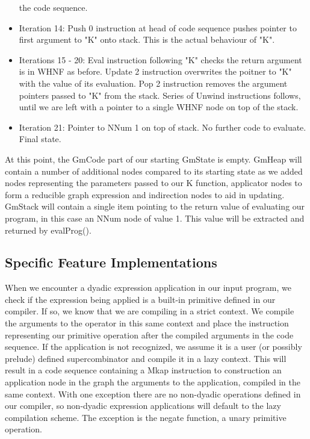 \begin{itemize}
          the code sequence.
    \item Iteration 14: Push 0 instruction at head of code sequence
          pushes pointer to first argument to "K" onto stack. This
          is the actual behaviour of "K".
    \item Iterations 15 - 20: Eval instruction following "K" checks
          the return argument is in WHNF as before. Update 2 instruction
          overwrites the poitner to "K" with the value of its evaluation.
          Pop 2 instruction removes the argument pointers passed to
          "K" from the stack. Series of Unwind instructions follows,
          until we are left with a pointer to a single WHNF node on
          top of the stack.
    \item Iteration 21: Pointer to NNum 1 on top of stack. No further
          code to evaluate. Final state.
\end{itemize}

At this point, the GmCode part of our starting GmState is empty.
GmHeap will contain a number of additional nodes compared to its
starting state as we added nodes representing the parameters passed
to our K function, applicator nodes to form a reducible graph 
expression and indirection nodes to aid in updating. GmStack will
contain a single item pointing to the return value of evaluating
our program, in this case an NNum node of value 1. This value will
be extracted and returned by evalProg().

\subsection{Specific Feature Implementations}
When we encounter a dyadic expression application in our input
program, we check if the expression being applied is a built-in
primitive defined in our compiler. If so, we know that we are
compiling in a strict context. We compile the arguments to the
operator in this same context and place the instruction 
representing our primitive operation after the compiled arguments
in the code sequence. If the application is not recognized, we
assume it is a user (or possibly prelude) defined supercombinator
and compile it in a lazy context. This will result in a code
sequence containing a Mkap instruction to construction an application
node in the graph the arguments to the application, compiled in the
same context. With one exception there are no non-dyadic operations
defined in our compiler, so non-dyadic expression applications
will default to the lazy compilation scheme. The exception is
the negate function, a unary primitive operation.

